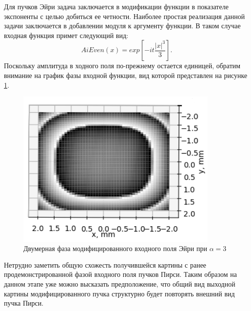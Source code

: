 {{    Для пучков Эйри задача заключается в модификации функции в показателе экспоненты с целью добиться ее четности.
    Наиболее простая реализация данной задачи заключается в добавлении модуля к аргументу функции.
    В таком случае входная функция примет следующий вид:
    \begin{equation*}
        AiEven(x) = exp[-it \frac{|x|^3}{3}].
    \end{equation*}
    Поскольку амплитуда в ходного поля по-прежнему остается единицей, обратим внимание на график фазы входной функции,
    вид которой представлен на рисунке \ref{aieven_phase_2d}.
    \begin{figure}[H]
        \begin{center}
            \includegraphics[width=10cm]{plots/aievenphase_new}
            \caption{Двумерная фаза модифицированного входного поля Эйри при $\alpha  = 3$}
            \label{aieven_phase_2d}
        \end{center}
    \end{figure}

    Нетрудно заметить общую схожесть получившейся картины с ранее продемонстрированной фазой входного поля пучков Пирси.
    Таким образом на данном этапе уже можно высказать предположение,
    что общий вид выходной картины модифицированного пучка структурно будет повторять внешний вид пучка Пирси.

}}
